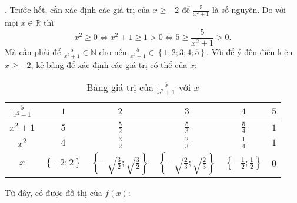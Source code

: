 . Trước hết, cần xác định các giá trị của $x \geq -2$ để $\frac{5}{x^2 + 1}$ là số nguyên. Do với mọi $x \in \mathbb{R}$ thì $$x^2 \geq 0 \iff x^2 + 1 \geq 1 > 0 \iff 5 \geq \frac{5}{x^2 + 1} > 0.$$ Mà cần phải để $\frac{5}{x^2 + 1} \in \mathbb{N}$ cho nên $\frac{5}{x^2 + 1} \in \left\{1; 2; 3; 4; 5\right\}$. Với để ý đến điều kiện $x \geq -2$, kẻ bảng để xác định các giá trị có thể của $x$:

\begin{table}[H]
   \centering
   \begin{tabular}{|c|c|c|c|c|c|}
   \hline
   $\displaystyle \frac{5}{x^2 + 1}$ & $1$ & $2$ & $3$ & $4$ & $5$ \\
   \hline
   $x^2 + 1$ & $5$ & $\displaystyle\frac{5}{2}$ & $\displaystyle\frac{5}{3}$ & $\displaystyle\frac{5}{4}$ & $1$ \\
   \hline
   $x^2$ & $4$ & $\displaystyle\frac{3}{2}$ & $\displaystyle\frac{2}{3}$ & $\displaystyle\frac{1}{4}$ & $1$ \\
   \hline
   $x$ & $\left\{-2; 2\right\}$ & $\left\{-\sqrt{\frac{3}{2}}; \sqrt{\frac{3}{2}}\right\}$ & $\left\{-\sqrt{\frac{2}{3}}; \sqrt{\frac{2}{3}}\right\}$ & $\left\{-\frac{1}{2}; \frac{1}{2}\right\}$ & $0$ \\
   \hline
   \end{tabular}
   \caption{Bảng giá trị của $\frac{5}{x^2 + 1}$ với $x$} 
\end{table}

Từ đây, có được đồ thị của $f(x)$:

